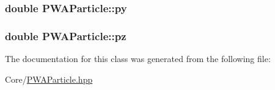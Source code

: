\label{d9/dcb/classPWAParticle_a785b498941ebc062698dbd34be8c6d96}
\hypertarget{classPWAParticle_a51a443171d65b2abd885c51f92068f85}{
\subsubsection[{py}]{\setlength{\rightskip}{0pt plus 5cm}double {\bf PWAParticle::py}}}
\label{d9/dcb/classPWAParticle_a51a443171d65b2abd885c51f92068f85}
\hypertarget{classPWAParticle_aaf5605fd8e557449072e9437add86a15}{
\subsubsection[{pz}]{\setlength{\rightskip}{0pt plus 5cm}double {\bf PWAParticle::pz}}}
\label{d9/dcb/classPWAParticle_aaf5605fd8e557449072e9437add86a15}


The documentation for this class was generated from the following file:\begin{DoxyCompactItemize}
\item 
Core/\hyperlink{PWAParticle_8hpp}{PWAParticle.hpp}\end{DoxyCompactItemize}
